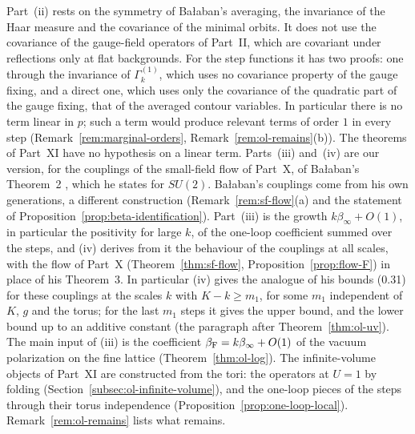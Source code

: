 Part~(ii) rests on the symmetry of Ba\l aban's averaging, the invariance of the Haar measure and the covariance of the minimal orbits. It does not use the covariance of the gauge-field operators of Part~II, which are covariant under reflections only at flat backgrounds. For the step functions it has two proofs: one through the invariance of $\Gamma^{(1)}_k$, which uses no covariance property of the gauge fixing, and a direct one, which uses only the covariance of the quadratic part of the gauge fixing, that of the averaged contour variables. In particular there is no term linear in $p$; such a term would produce relevant terms of order $1$ in every step (Remark~\ref{rem:marginal-orders}, Remark~\ref{rem:ol-remains}(b)). The theorems of Part~XI have no hypothesis on a linear term. Parts~(iii) and~(iv) are our version, for the couplings of the small-field flow of Part~X, of Ba\l aban's Theorem~2 \cite{BalYM4I}, which he states for $SU(2)$. Ba\l aban's couplings come from his own generations, a different construction (Remark~\ref{rem:sf-flow}(a) and the statement of Proposition~\ref{prop:beta-identification}). Part~(iii) is the growth $k\beta_\infty+O(1)$, in particular the positivity for large $k$, of the one-loop coefficient summed over the steps, and (iv) derives from it the behaviour of the couplings at all scales, with the flow of Part~X (Theorem~\ref{thm:sf-flow}, Proposition~\ref{prop:flow-F}) in place of his Theorem~3. In particular (iv) gives the analogue of his bounds (0.31) for these couplings at the scales $k$ with $K-k\ge m_1$, for some $m_1$ independent of $K$, $g$ and the torus; for the last $m_1$ steps it gives the upper bound, and the lower bound up to an additive constant (the paragraph after Theorem~\ref{thm:ol-uv}). The main input of (iii) is the coefficient $\beta_{\rm F}=k\beta_\infty+O(1)$ of the vacuum polarization on the fine lattice (Theorem~\ref{thm:ol-log}). The infinite-volume objects of Part~XI are constructed from the tori: the operators at $U=1$ by folding (Section~\ref{subsec:ol-infinite-volume}), and the one-loop pieces of the steps through their torus independence (Proposition~\ref{prop:one-loop-local}). Remark~\ref{rem:ol-remains} lists what remains.

